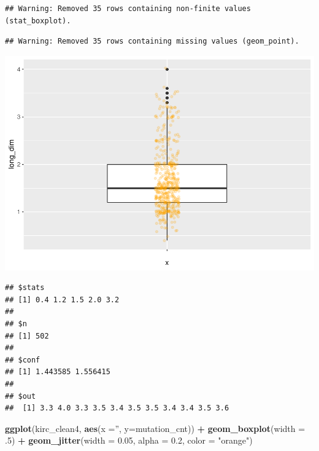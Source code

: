 \documentclass[]{article}
\newenvironment{Shaded}{\begin{snugshade}}{\end{snugshade}}
\newcommand{\KeywordTok}[1]{\textcolor[rgb]{0.13,0.29,0.53}{\textbf{#1}}}
\newcommand{\DataTypeTok}[1]{\textcolor[rgb]{0.13,0.29,0.53}{#1}}
\newcommand{\DecValTok}[1]{\textcolor[rgb]{0.00,0.00,0.81}{#1}}
\newcommand{\FloatTok}[1]{\textcolor[rgb]{0.00,0.00,0.81}{#1}}
\newcommand{\StringTok}[1]{\textcolor[rgb]{0.31,0.60,0.02}{#1}}
\newcommand{\OperatorTok}[1]{\textcolor[rgb]{0.81,0.36,0.00}{\textbf{#1}}}
\newcommand{\NormalTok}[1]{#1}
\begin{document}
\begin{verbatim}
## Warning: Removed 35 rows containing non-finite values (stat_boxplot).
\end{verbatim}

\begin{verbatim}
## Warning: Removed 35 rows containing missing values (geom_point).
\end{verbatim}

\includegraphics{figs/render-unnamed-chunk-19-1.pdf}

\begin{Shaded}
\end{Shaded}

\begin{verbatim}
## $stats
## [1] 0.4 1.2 1.5 2.0 3.2
## 
## $n
## [1] 502
## 
## $conf
## [1] 1.443585 1.556415
## 
## $out
##  [1] 3.3 4.0 3.3 3.5 3.4 3.5 3.5 3.4 3.4 3.5 3.6
\end{verbatim}

\begin{Shaded}
\begin{Highlighting}[]
\KeywordTok{ggplot}\NormalTok{(kirc_clean4, }\KeywordTok{aes}\NormalTok{(}\DataTypeTok{x =}\StringTok{''}\NormalTok{, }\DataTypeTok{y=}\NormalTok{mutation_cnt)) }\OperatorTok{+}
\StringTok{     }\KeywordTok{geom_boxplot}\NormalTok{(}\DataTypeTok{width =}\NormalTok{ .}\DecValTok{5}\NormalTok{) }\OperatorTok{+}
\StringTok{     }\KeywordTok{geom_jitter}\NormalTok{(}\DataTypeTok{width =} \FloatTok{0.05}\NormalTok{, }\DataTypeTok{alpha =} \FloatTok{0.2}\NormalTok{, }\DataTypeTok{color =} \StringTok{"orange"}\NormalTok{)}
\end{Highlighting}
\end{Shaded}
\end{document}
